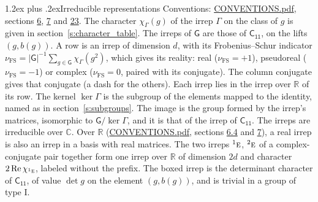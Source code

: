 \documentclass[10pt,a4paper]{article}
\makeatletter
\renewcommand\section{\@startsection{section}{1}{\z@}{-3ex plus -1ex minus -.2ex}%
  {1.2ex plus .2ex}{\normalfont\large\sffamily\bfseries\color{parttitle}}}
\numberwithin{equation}{section}
\newcommand{\grp}[1]{\mathsf{#1}}
\newcommand{\irr}[1]{\text{\normalfont\scshape #1}}
\newcommand{\conjpair}[1]{{}^{#1}}
\newcommand{\irchar}[1]{\chi_{#1}}
\newcommand{\fsind}{\nu_{\mathrm{FS}}}
\makeatother
\begin{document}
\section{Irreducible representations}\label{s:irreps}
Conventions: \href{../../CONVENTIONS.pdf}{CONVENTIONS.pdf}, sections \href{../../../rotation/CONVENTIONS.pdf\#conv.6}{6}, \href{../../../rotation/CONVENTIONS.pdf\#conv.7}{7} and \href{../../CONVENTIONS.pdf\#conv.23}{23}.
\leavevmode\label{n:function.character}\label{n:irrep.Gamma}The character $\irchar{\Gamma}(g)$ of the irrep $\Gamma$ on the class of $g$ is given in section~\ref{s:character_table}. The irreps of $\grp{G}$ are those of \href{../../../rotation/data/pdf/C11.pdf}{$\grp{C_{11}}$}, on the lifts $(g, b(g))$.
\leavevmode\label{n:index.dimension}\label{n:index.frobenius}\label{n:head.irrep}\label{n:head.reality}A row is an irrep of dimension $d$, with its Frobenius--Schur indicator $\fsind = |\grp{G}|^{-1}\allowbreak\sum_{g\in\grp{G}}\irchar{\Gamma}(g^2)$, which gives its reality: real ($\fsind = +1$), pseudoreal ($\fsind = -1$) or complex ($\fsind = 0$, paired with its conjugate). \label{n:head.conjugate}The column conjugate gives that conjugate (a dash for the others). \label{n:head.over.real}Each irrep lies in the irrep over $\mathbb{R}$ of its row. \label{n:head.kernel}The kernel $\ker\Gamma$ is the subgroup of the elements mapped to the identity, named as in section~\ref{s:subgroups}. \label{n:head.image}The image is the group formed by the irrep's matrices, isomorphic to $\grp{G}/\ker\Gamma$, and it is that of the irrep of \href{../../../rotation/data/pdf/C11.pdf}{$\grp{C_{11}}$}. The irreps are irreducible over $\mathbb{C}$. Over $\mathbb{R}$ (\href{../../CONVENTIONS.pdf}{CONVENTIONS.pdf}, sections \href{../../../rotation/CONVENTIONS.pdf\#conv.6.4}{6.4} and \href{../../../rotation/CONVENTIONS.pdf\#conv.7}{7}), a real irrep is also an irrep in a basis with real matrices. The two irreps $\conjpair{1}\irr{e}$, $\conjpair{2}\irr{e}$ of a complex-conjugate pair together form one irrep over $\mathbb{R}$ of dimension $2d$ and character $2\operatorname{Re}\irchar{\conjpair{1}\irr{e}}$, labeled without the prefix. \label{n:mark.determinant}The boxed irrep is the determinant character of \href{../../../rotation/data/pdf/C11.pdf}{$\grp{C_{11}}$}, of value $\det g$ on the element $(g, b(g))$, and is trivial in a group of type I.
\setlength{\emergencystretch}{2em}\par\setlength{\emergencystretch}{0pt}
\end{document}
